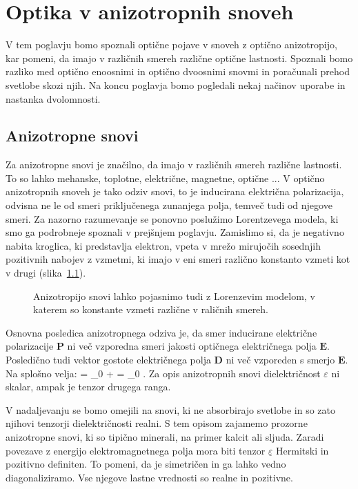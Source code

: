 
\chapter{Optika v anizotropnih snoveh}
\label{chap:AnizotropneSnovi}
V tem poglavju bomo spoznali optične pojave v snoveh z optično anizotropijo, kar pomeni,
da imajo v različnih smereh različne optične lastnosti. Spoznali bomo razliko med
optično enoosnimi in optično dvoosnimi snovmi in poračunali prehod svetlobe skozi njih. 
Na koncu poglavja bomo pogledali nekaj načinov uporabe in nastanka dvolomnosti.

\section{Anizotropne snovi}
Za anizotropne snovi je značilno, da imajo v različnih smereh različne lastnosti. To so lahko
mehanske, toplotne, električne, magnetne, optične ... V optično anizotropnih snoveh je tako
odziv snovi, to je inducirana električna polarizacija, odvisna ne le od smeri priključenega
zunanjega polja, temveč tudi od njegove smeri. Za nazorno razumevanje se ponovno poslužimo
Lorentzevega modela, ki smo ga podrobneje spoznali v prejšnjem poglavju. Zamislimo si, 
da je negativno nabita kroglica, ki predstavlja elektron, vpeta v mrežo mirujočih sosednjih 
pozitivnih nabojev z vzmetmi, ki imajo v eni smeri različno konstanto vzmeti kot v drugi 
(slika~\ref{fig:10_model}).
\begin{figure}[!h]
\centering
\def\svgwidth{90truemm} 
%
\caption{Anizotropijo snovi lahko pojasnimo tudi z Lorenzevim modelom, v katerem so
konstante vzmeti različne v raličnih smereh.}
\label{fig:10_model}
\end{figure}

Osnovna posledica anizotropnega odziva je, da smer inducirane električne polarizacije $\mathbf{P}$
ni več vzporedna smeri jakosti optičnega električnega polja $\mathbf{E}$. Posledično tudi 
vektor gostote električnega polja $\mathbf{D}$ ni več vzporeden s smerjo $\mathbf{E}$. 
Na splošno velja:
\beq
{} = \varepsilon_0  +  = \varepsilon_0 \underline{\varepsilon} .
\label{eq:10_001}
\eeq
Za opis anizotropnih snovi dielektričnost $\varepsilon$ ni skalar, ampak je tenzor drugega
ranga.

V nadaljevanju se bomo omejili na snovi, ki ne absorbirajo svetlobe in so zato njihovi 
tenzorji dielektričnosti realni. S tem opisom zajamemo prozorne anizotropne snovi, ki so
tipično minerali, na primer kalcit ali  sljuda. Zaradi povezave z energijo elektromagnetnega polja
mora biti tenzor $\underline{\varepsilon}$ Hermitski in pozitivno definiten. 
To pomeni, da je  simetričen in ga lahko vedno diagonaliziramo. Vse njegove lastne vrednosti so realne in pozitivne.

